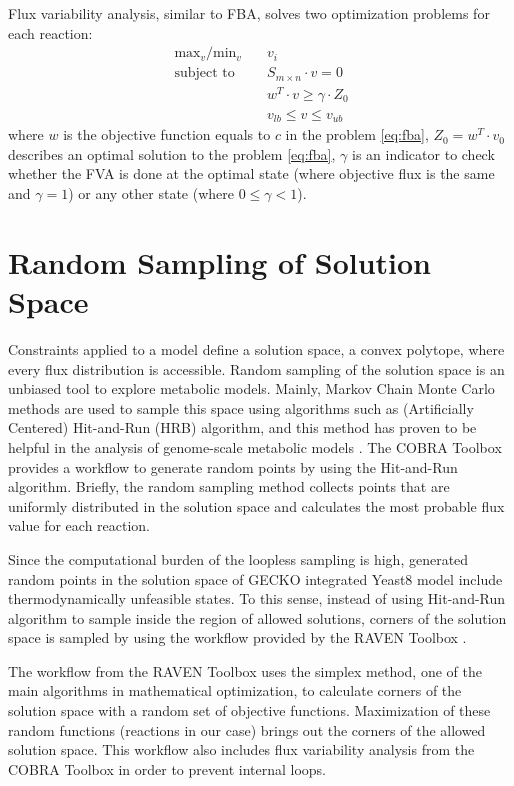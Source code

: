 Flux variability analysis, similar to FBA, solves two optimization problems for each reaction:
 \begin{align}
 \ \text{max}_v / \text{min}_v \quad & v_i \\
 \ \text{subject to} \quad & S_{m \times n} \cdot v=0 \\
 \ & w^T \cdot v \geq \gamma \cdot Z_0 \\
 \ & v_{lb} \leq v \leq v_{ub}
 \end{align}
\noindent where $w$ is the objective function equals to $c$ in the problem \ref{eq:fba}, $Z_0 = w^T \cdot v_0$ describes an optimal solution to the problem \ref{eq:fba}, $\gamma$ is an indicator to check whether the FVA is done at the optimal state (where objective flux is the same and $\gamma = 1$) or any other state (where $0 \leq \gamma < 1$).


\section{Random Sampling of Solution Space}
Constraints applied to a model define a solution space, a convex polytope, where every flux distribution is accessible. Random sampling of the solution space is an unbiased tool to explore metabolic models. Mainly, Markov Chain Monte Carlo methods are used to sample this space using algorithms such as (Artificially Centered) Hit-and-Run (HRB) \cite{kiatsupaibul2011analysis, saa2016ll} algorithm, and this method has proven to be helpful in the analysis of genome-scale metabolic models \cite{schellenberger2009use}. The COBRA Toolbox \cite{heirendt2019creation} provides a workflow to generate random points by using the Hit-and-Run algorithm. Briefly, the random sampling method collects points that are uniformly distributed in the solution space and calculates the most probable flux value for each reaction.

Since the computational burden of the loopless sampling is high, generated random points in the solution space of GECKO integrated Yeast8 model include thermodynamically unfeasible states. To this sense, instead of using Hit-and-Run algorithm to sample inside the region of allowed solutions, corners of the solution space is sampled by using the workflow provided by the RAVEN Toolbox \cite{wang2018raven}.

The workflow from the RAVEN Toolbox uses the simplex method, one of the main algorithms in mathematical optimization, to calculate corners of the solution space with a random set of objective functions. Maximization of these random functions (reactions in our case) brings out the corners of the allowed solution space. This workflow also includes flux variability analysis from the COBRA Toolbox in order to prevent internal loops.

